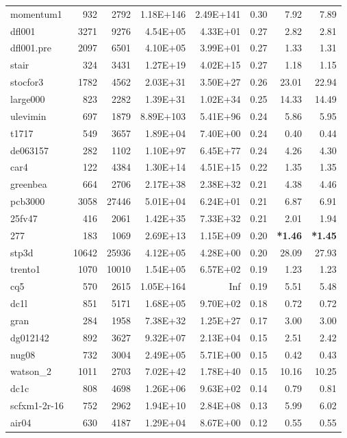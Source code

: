 \documentclass[10pt]{article}
\newcommand{\red}{
	\color{red}	
	}
\begin{document}
\begin{longtable}{|l|r|r|r|r|r|r|r|}
momentum1	&	932	&	2792	&	1.18E+146	&	2.49E+141	&	0.30	&	7.92	&	7.89	\\
dfl001	&	3271	&	9276	&	4.54E+05	&	4.33E+01	&	0.27	&	2.82	&	2.81	\\
dfl001.pre	&	2097	&	6501	&	4.10E+05	&	3.99E+01	&	0.27	&	1.33	&	1.31	\\
stair	&	324	&	3431	&	1.27E+19	&	4.02E+15	&	0.27	&	1.18	&	1.15	\\
stocfor3	&	1782	&	4562	&	2.03E+31	&	3.50E+27	&	0.26	&	23.01	&	22.94	\\
large000	&	823	&	2282	&	1.39E+31	&	1.02E+34	&	0.25	&	14.33	&	14.49	\\
ulevimin	&	697	&	1879	&	8.89E+103	&	5.41E+96	&	0.24	&	5.86	&	5.95	\\
t1717	&	549	&	3657	&	1.89E+04	&	7.40E+00	&	0.24	&	0.40	&	0.44	\\
de063157	&	282	&	1102	&	1.10E+97	&	6.45E+77	&	0.24	&	4.26	&	4.30	\\
car4	&	122	&	4384	&	1.30E+14	&	4.51E+15	&	0.22	&	1.35	&	1.35	\\
greenbea	&	664	&	2706	&	2.17E+38	&	2.38E+32	&	0.21	&	4.38	&	4.46	\\
pcb3000	&	3058	&	27446	&	5.01E+04	&	6.24E+01	&	0.21	&	6.87	&	6.91	\\
25fv47	&	416	&	2061	&	1.42E+35	&	7.33E+32	&	0.21	&	2.01	&	1.94	\\
277	&	183	&	1069	&	2.69E+13	&	1.15E+09	&	0.20	&	{\bf \red *1.46} 	&	{\bf \red *1.45}	\\
stp3d	&	10642	&	25936	&	4.12E+05	&	4.28E+00	&	0.20	&	28.09	&	27.93	\\
trento1	&	1070	&	10010	&	1.54E+05	&	6.57E+02	&	0.19	&	1.23	&	1.23	\\
cq5	&	570	&	2615	&	1.05E+164	&	Inf	&	0.19	&	5.51	&	5.48	\\
dc1l	&	851	&	5171	&	1.68E+05	&	9.70E+02	&	0.18	&	0.72	&	0.72	\\
gran	&	284	&	1958	&	7.38E+32	&	1.25E+27	&	0.17	&	3.00	&	3.00	\\
dg012142	&	892	&	3627	&	9.32E+07	&	2.13E+04	&	0.15	&	2.51	&	2.42	\\
nug08	&	732	&	3004	&	2.49E+05	&	5.71E+00	&	0.15	&	0.42	&	0.43	\\
watson\_2	&	1011	&	2703	&	7.02E+42	&	1.78E+40	&	0.15	&	10.16	&	10.25	\\
dc1c	&	808	&	4698	&	1.26E+06	&	9.63E+02	&	0.14	&	0.79	&	0.81	\\
scfxm1-2r-16	&	752	&	2962	&	1.94E+10	&	2.84E+08	&	0.13	&	5.99	&	6.02	\\
air04	&	630	&	4187	&	1.29E+04	&	8.67E+00	&	0.12	&	0.55	&	0.55	\\

\end{longtable}
\end{document}
